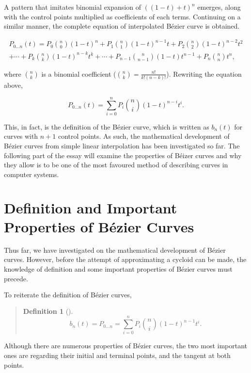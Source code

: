 \documentclass[11pt, oneside, appendixprefix=Appendix]{article}
\theoremstyle{definition}
\newtheorem{definition_heading}{Definition}
\newenvironment{definition}
{\begin{quote} \begin{definition_heading}}
{\end{definition_heading} \end{quote}}
\numberwithin{figure}{section}
\begin{document}
A pattern that imitates binomial expansion of $((1-t) + t)^n$ emerges, along with the control points multiplied as coefficients of each terms. Continuing on a similar manner, the complete equation of interpolated B\'ezier curve is obtained.

\begin{multline}
P_{0 \dotsc n}(t) = 	P_0 \binom{n}{0}(1-t)^n + P_1 \binom{n}{1}(1-t)^{n-1}t + P_2 \binom{n}{2}(1-t)^{n-2}t^2 \\
				+ \dotsb + P_k \binom{n}{k}(1-t)^{n-k}t^k + \dotsb + P_{n-1} \binom{n}{n-1}(1-t)t^{n-1} + P_n \binom{n}{n}t^n,
\end{multline}

where $\binom{n}{k}$ is a binomial coefficient ($\binom{n}{k} = \frac{n!}{k!(n-k)!}$). Rewriting the equation above,

\begin{equation}
P_{0 \dotsc n}(t) = \sum_{i=0}^{n} {P_i \binom{n}{i} (1-t)^{n-i} t^i}.
\end{equation}

This, in fact, is the definition of the B\'ezier curve, which is written as $b_n(t)$ for curves with $n+1$ control points. As such, the mathematical development of B\'ezier curves from simple linear interpolation has been investigated so far. The following part of the essay will examine the properties of B\'eizer curves and why they allow is to be one of the most favoured method of describing curves in computer systems.

\section{Definition and Important Properties of B\'ezier Curves}

Thus far, we have investigated on the mathematical development of B\'ezier curves. However, before the attempt of approximating a cycloid can be made, the knowledge of definition and some important properties of B\'ezier curves must precede.

To reiterate the definition of B\'ezier curves,

\begin{definition}[]
\begin{equation}
b_n(t) = P_{0 \dotsc n} = \sum_{i=0}^{n} {P_i \binom{n}{i} (1-t)^{n-1} t^i}.
\end{equation}
\end{definition}

Although there are numerous properties of B\'ezier curves, the two most important ones are regarding their initial and terminal points, and the tangent at both points.
\end{document}
